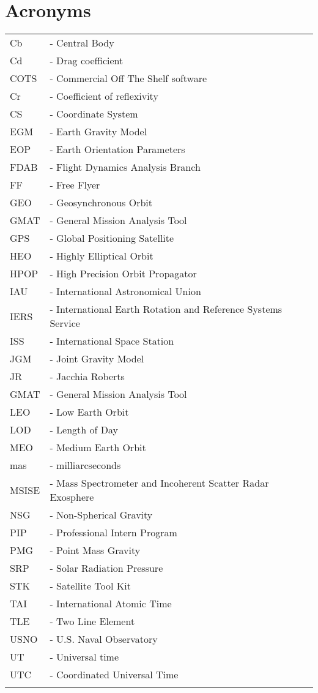 \chapter{Acronyms}
\label{Ch:Acronyms}
\begin{table}[h!]
      \begin{tabular}{ll}
        Cb &- Central Body\\
        Cd &- Drag coefficient\\
        COTS &- Commercial Off The Shelf software\\
        Cr &- Coefficient of reflexivity\\
        CS &- Coordinate System\\
        EGM &- Earth Gravity Model\\
        EOP &- Earth Orientation Parameters\\
        FDAB &- Flight Dynamics Analysis Branch\\
        FF &- Free Flyer \\
        GEO &- Geosynchronous Orbit \\
        GMAT &- General Mission Analysis Tool\\
        GPS &- Global Positioning Satellite\\
        HEO &- Highly Elliptical Orbit \\
        HPOP &- High Precision Orbit Propagator\\
        IAU &- International Astronomical Union\\
        IERS &- International Earth Rotation and Reference Systems Service\\
        ISS &- International Space Station\\
        JGM &- Joint Gravity Model\\
        JR &- Jacchia Roberts\\
        GMAT &- General Mission Analysis Tool\\
        LEO &- Low Earth Orbit\\
        LOD &- Length of Day\\
        MEO &- Medium Earth Orbit\\
        mas &- milliarcseconds\\
        MSISE &- Mass Spectrometer and Incoherent Scatter Radar Exosphere\\
        NSG &- Non-Spherical Gravity\\
        PIP &- Professional Intern Program\\
        PMG &- Point Mass Gravity\\
        SRP &- Solar Radiation Pressure\\
        STK &- Satellite Tool Kit \\
        TAI &- International Atomic Time \\
        TLE &- Two Line Element\\
        USNO &- U.S. Naval Observatory\\
        UT &- Universal time\\
        UTC &- Coordinated Universal Time\\
      \label{Table: Acronyms}
\end{tabular}
\end{table}
